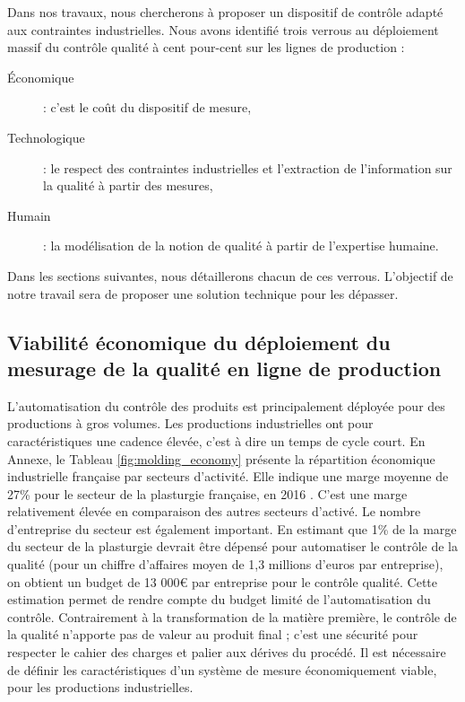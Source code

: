 Dans nos travaux, nous chercherons à proposer un dispositif de contrôle adapté aux contraintes industrielles.
Nous avons identifié trois verrous au déploiement massif du contrôle qualité à cent pour-cent sur les lignes de production :
\begin{description}
	\item[Économique] : c’est le coût du dispositif de mesure,
	\item[Technologique] : le respect des contraintes industrielles et l'extraction de l'information sur la qualité à partir des mesures,
	\item[Humain] : la modélisation de la notion de qualité à partir de l'expertise humaine.
\end{description}
Dans les sections suivantes, nous détaillerons chacun de ces verrous.
L'objectif de notre travail sera de proposer une solution technique pour les dépasser.

\subsection{Viabilité économique du déploiement du mesurage de la qualité en ligne de production}

L'automatisation du contrôle des produits est principalement déployée pour des productions à gros volumes.
Les productions industrielles ont pour caractéristiques une cadence élevée, c'est à dire un temps de cycle court.  %
En Annexe, le Tableau \ref{fig:molding_economy} présente la répartition économique industrielle française par secteurs d'activité.
Elle indique une marge moyenne de 27\% pour le secteur de la plasturgie française, en 2016 \cite{directiongeneraledesentreprises_chiffres_2019}.
C'est une marge relativement élevée en comparaison des autres secteurs d'activé.
Le nombre d'entreprise du secteur est également important.
En estimant que 1\% de la marge du secteur de la plasturgie devrait être dépensé pour automatiser le contrôle de la qualité (pour un chiffre d'affaires moyen de 1,3 millions d'euros par entreprise), on obtient un budget de 13 000€ par entreprise pour le contrôle qualité.
Cette estimation permet de rendre compte du budget limité de l'automatisation du contrôle.
Contrairement à la transformation de la matière première, le contrôle de la qualité n'apporte pas de valeur au produit final ; c'est une sécurité pour respecter le cahier des charges et palier aux dérives du procédé.
Il est nécessaire de définir les caractéristiques d'un système de mesure économiquement viable, pour les productions industrielles.

